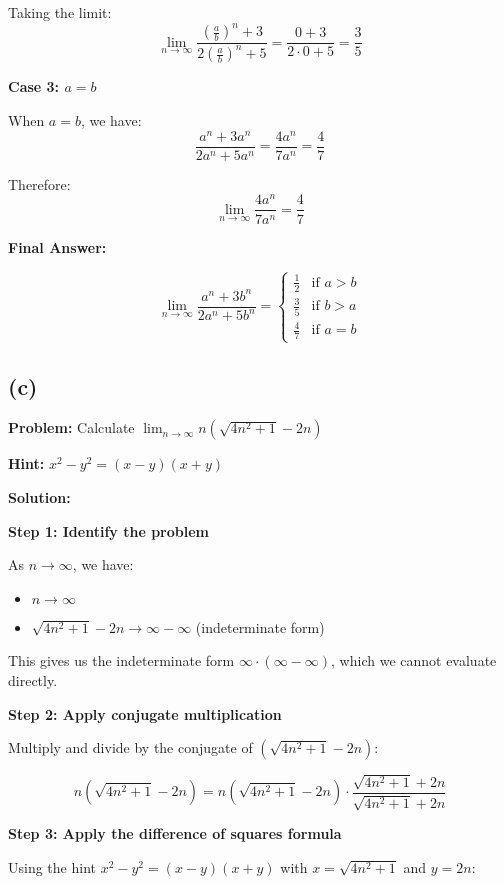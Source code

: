 \documentclass[12pt,a4paper]{article}
\theoremstyle{definition}
\theoremstyle{remark}
\begin{document}
Taking the limit:
$$\lim_{n \to \infty} \frac{\left(\frac{a}{b}\right)^n + 3}{2\left(\frac{a}{b}\right)^n + 5} = \frac{0 + 3}{2 \cdot 0 + 5} = \frac{3}{5}$$

\textbf{Case 3: $a = b$}

When $a = b$, we have:
$$\frac{a^n + 3a^n}{2a^n + 5a^n} = \frac{4a^n}{7a^n} = \frac{4}{7}$$

Therefore:
$$\lim_{n \to \infty} \frac{4a^n}{7a^n} = \frac{4}{7}$$

\textbf{Final Answer:}

$$\lim_{n \to \infty} \frac{a^n + 3b^n}{2a^n + 5b^n} = \begin{cases}
\frac{1}{2} & \text{if } a > b \\
\frac{3}{5} & \text{if } b > a \\
\frac{4}{7} & \text{if } a = b
\end{cases}$$


\subsection*{(c)}
\textbf{Problem:} Calculate $\lim_{n \to \infty} n\left(\sqrt{4n^2 + 1} - 2n\right)$

\textbf{Hint:} $x^2 - y^2 = (x - y)(x + y)$

\textbf{Solution:}

\textbf{Step 1: Identify the problem}

As $n \to \infty$, we have:
\begin{itemize}
\item $n \to \infty$
\item $\sqrt{4n^2 + 1} - 2n \to \infty - \infty$ (indeterminate form)
\end{itemize}

This gives us the indeterminate form $\infty \cdot (\infty - \infty)$, which we cannot evaluate directly.

\textbf{Step 2: Apply conjugate multiplication}

Multiply and divide by the conjugate of $(\sqrt{4n^2 + 1} - 2n)$:

$$n\left(\sqrt{4n^2 + 1} - 2n\right) = n\left(\sqrt{4n^2 + 1} - 2n\right) \cdot \frac{\sqrt{4n^2 + 1} + 2n}{\sqrt{4n^2 + 1} + 2n}$$

\textbf{Step 3: Apply the difference of squares formula}

Using the hint $x^2 - y^2 = (x - y)(x + y)$ with $x = \sqrt{4n^2 + 1}$ and $y = 2n$:
\end{document}
